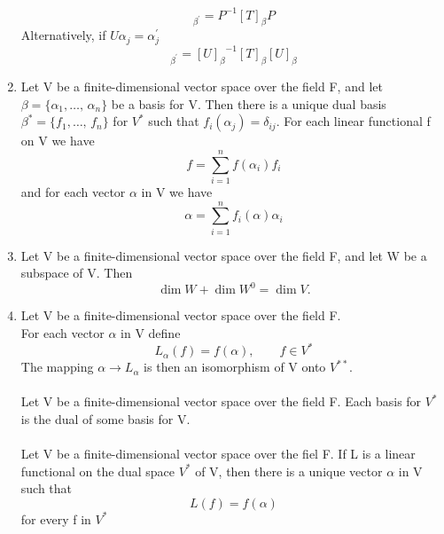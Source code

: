 \documentclass[12pt, a4paper]{article}
\begin{document}
\begin{CJK*}{UTF8}{bsmi}
\begin{enumerate}
\begin{equation}
        [T]_{\beta^\prime} = P^{-1}[T]_{\beta}P
    \end{equation}
    Alternatively, if \(U\alpha_j=\alpha_j^\prime\)\begin{equation}
        [T]_{\beta^\prime} = {[U]_\beta}^{-1}[T]_{\beta}[U]_\beta
    \end{equation}
    \item Let V be a finite-dimensional vector space over the field F, and let \(\beta=\{\alpha_1,\ldots,\,\alpha_n\}\) be a basis for V. Then there is a unique dual basis \(\beta^{*}=\{f_1,\ldots,\,f_n\}\) for \(V^{*}\) such that \(f_i(\alpha_j)=\delta_{ij}\). For each linear functional f on V we have \begin{equation}
        f = \sum_{i=1}^n f(\alpha_i)f_i
    \end{equation}
    and for each vector \(\alpha\) in V we have\begin{equation}
        \alpha = \sum_{i=1}^n f_i(\alpha)\alpha_i
    \end{equation}
    \item Let V be a finite-dimensional vector space over the field F, and let W be a subspace of V. Then\begin{equation}
        \dim W + \dim {W^0} = \dim V.
    \end{equation}
    \item Let V be a finite-dimensional vector space over the field F.\\ For each vector \(\alpha\) in V define\begin{equation}
        L_\alpha(f) = f(\alpha),\qquad f\in V^*
    \end{equation}
    The mapping \(\alpha \xrightarrow{} L_\alpha\) is then an isomorphism of V onto \(V^{**}\).
    \\  \\
    Let V be a finite-dimensional vector space over the field F. Each basis for \(V^*\) is the dual of some basis for V.\\
     \\
    Let V be a finite-dimensional vector space over the fiel F. If L is a linear functional on the dual space \(V^*\) of V, then there is a unique vector \(\alpha\) in V such that \begin{equation}
        L(f) = f(\alpha)
    \end{equation}
    for every f in \(V^*\)
\end{enumerate}
\end{CJK*}
\end{document}
